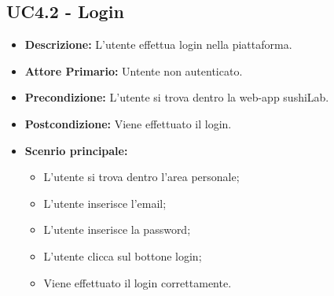 \subsection{UC4.2 - Login}
\begin{itemize}
    \item \textbf{Descrizione:} L'utente effettua login nella piattaforma.
    \item \textbf{Attore Primario:} Untente non autenticato.
    \item \textbf{Precondizione:} L'utente si trova dentro la web-app sushiLab.
    \item \textbf{Postcondizione:} Viene effettuato il login.
    \item \textbf{Scenrio principale:}
    \begin{itemize}
        \item L'utente si trova dentro l'area personale;
        \item L'utente inserisce l'email;
        \item L'utente inserisce la password;
        \item L'utente clicca sul bottone login;
        \item Viene effettuato il login correttamente.
    \end{itemize}
\end{itemize}
